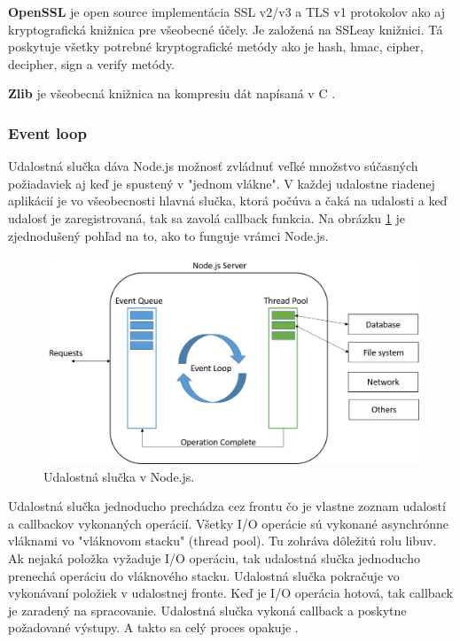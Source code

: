 \textbf{OpenSSL} je open source implementácia SSL v2/v3 a TLS v1 protokolov ako aj kryptografická knižnica pre všeobecné účely. Je založená na SSLeay knižnici. Tá poskytuje všetky potrebné kryptografické metódy ako je hash, hmac, cipher, decipher, sign a verify metódy.

\textbf{Zlib} je všeobecná knižnica na kompresiu dát napísaná v C \cite{nodejs-arch}.


\subsubsection{Event loop}
Udalostná slučka dáva Node.js možnosť zvládnuť veľké množstvo súčasných požiadaviek aj keď je spustený v "jednom vlákne". V každej udalostne riadenej aplikácií je vo všeobecnosti hlavná slučka, ktorá počúva a čaká na udalosti a keď udalosť je zaregistrovaná, tak sa zavolá callback funkcia. Na obrázku \ref{img-node-event-loop} je zjednodušený pohľad na to, ako to funguje vrámci Node.js.

\begin{figure}[H]
  \centering
  \includegraphics[scale=0.6]{img/node/nodejs-event-loop.png}
  \caption{Udalostná slučka v Node.js.}
  \label{img-node-event-loop}
\end{figure}

Udalostná slučka jednoducho prechádza cez frontu čo je vlastne zoznam udalostí a callbackov vykonaných operácií. Všetky I/O operácie sú vykonané asynchrónne vláknami vo "vláknovom stacku" (thread pool). Tu zohráva dôležitú rolu libuv. Ak nejaká položka vyžaduje I/O operáciu, tak udalostná slučka jednoducho prenechá operáciu do vláknového stacku. Udalostná slučka pokračuje vo vykonávaní položiek v udalostnej fronte. Keď je I/O operácia hotová, tak callback je zaradený na spracovanie. Udalostná slučka vykoná callback a poskytne požadované výstupy. A takto sa celý proces opakuje \cite{nodejs-event-loop}.

